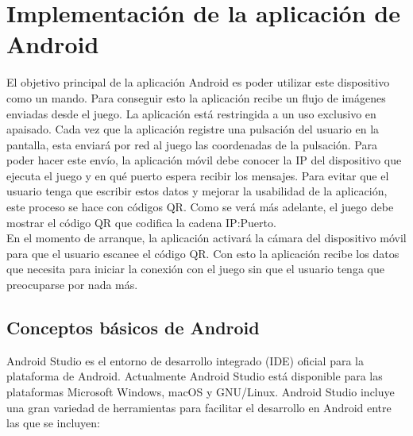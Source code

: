 \section{Implementaci\'on de la aplicaci\'on de Android}
\label{android}

El objetivo principal de la aplicaci\'on Android es poder utilizar este dispositivo como un mando. Para conseguir esto la aplicaci\'on recibe un flujo de im\'agenes enviadas desde el juego. La aplicaci\'on est\'a restringida a un uso exclusivo en apaisado. Cada vez que la aplicaci\'on registre una pulsaci\'on del usuario en la pantalla, esta enviar\'a por red al juego las coordenadas de la pulsaci\'on. Para poder hacer este env\'io, la aplicaci\'on m\'ovil debe conocer la IP del dispositivo que ejecuta el juego y en qu\'e puerto espera recibir los mensajes. Para evitar que el usuario tenga que escribir estos datos y mejorar la usabilidad de la aplicaci\'on, este proceso se hace con c\'odigos QR. Como se ver\'a m\'as adelante, el juego debe mostrar el c\'odigo QR que codifica la cadena IP:Puerto.\\

En el momento de arranque, la aplicaci\'on activar\'a la c\'amara del dispositivo m\'ovil para que el usuario escanee el c\'odigo QR. Con esto la aplicaci\'on recibe los datos que necesita para iniciar la conexi\'on con el juego sin que el usuario tenga que preocuparse por nada m\'as.\\

\subsection {Conceptos b\'asicos de Android}



Android Studio es el entorno de desarrollo integrado (IDE) oficial para la plataforma de Android. Actualmente Android Studio est\'a disponible para las plataformas Microsoft Windows, macOS y GNU/Linux. Android Studio incluye una gran variedad de herramientas para facilitar el desarrollo en Android entre las que se incluyen:\\

